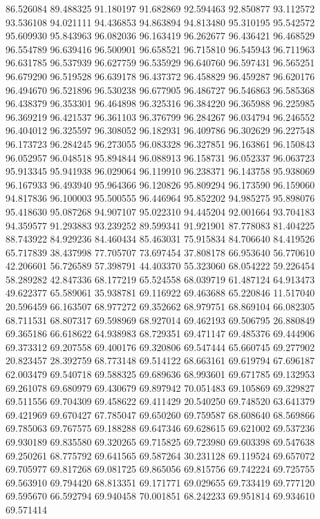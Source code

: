 86.526084
89.488325
91.180197
91.682869
92.594463
92.850877
93.112572
93.536108
94.021111
94.436853
94.863894
94.813480
95.310195
95.542572
95.609930
95.843963
96.082036
96.163419
96.262677
96.436421
96.468529
96.554789
96.639416
96.500901
96.658521
96.715810
96.545943
96.711963
96.631785
96.537939
96.627759
96.535929
96.640760
96.597431
96.565251
96.679290
96.519528
96.639178
96.437372
96.458829
96.459287
96.620176
96.494670
96.521896
96.530238
96.677905
96.486727
96.546863
96.585368
96.438379
96.353301
96.464898
96.325316
96.384220
96.365988
96.225985
96.369219
96.421537
96.361103
96.376799
96.284267
96.034794
96.246552
96.404012
96.325597
96.308052
96.182931
96.409786
96.302629
96.227548
96.173723
96.284245
96.273055
96.083328
96.327851
96.163861
96.150843
96.052957
96.048518
95.894844
96.088913
96.158731
96.052337
96.063723
95.913345
95.941938
96.029064
96.119910
96.238371
96.143758
95.938069
96.167933
96.493940
95.964366
96.120826
95.809294
96.173590
96.159060
94.817836
96.100003
95.500555
96.446964
95.852202
94.985275
95.898076
95.418630
95.087268
94.907107
95.022310
94.445204
92.001664
93.704183
94.359577
91.293883
93.239252
89.599341
91.921901
87.778083
81.404225
88.743922
84.929236
84.460434
85.463031
75.915834
84.706640
84.419526
65.717839
38.437998
77.705707
73.697454
37.808178
66.953640
56.770610
42.206601
56.726589
57.398791
44.403370
55.323060
68.054222
59.226454
58.289282
42.847336
68.177219
65.524558
68.039719
61.487124
64.913473
49.622377
65.589061
35.938781
69.116922
69.463688
65.220846
11.517040
20.596459
66.163507
68.977272
69.352662
68.979751
68.869104
66.082305
68.711531
68.807317
69.598969
68.927014
69.462193
69.506795
26.880849
69.365186
66.618622
64.938983
68.729351
69.471147
69.485376
69.444906
69.373312
69.207558
69.400176
69.320806
69.547444
65.660745
69.277902
20.823457
28.392759
68.773148
69.514122
68.663161
69.619794
67.696187
62.003479
69.540718
69.588325
69.689636
68.993601
69.671785
69.132953
69.261078
69.680979
69.430679
69.897942
70.051483
69.105869
69.329827
69.511556
69.704309
69.458622
69.411429
20.540250
69.748520
63.641379
69.421969
69.670427
67.785047
69.650260
69.759587
68.608640
68.569866
69.785063
69.767575
69.188288
69.647346
69.628615
69.621002
69.537236
69.930189
69.835580
69.320265
69.715825
69.723980
69.603398
69.547638
69.250261
68.775792
69.641565
69.587264
30.231128
69.119524
69.657072
69.705977
69.817268
69.081725
69.865056
69.815756
69.742224
69.725755
69.563910
69.794420
68.813351
69.171771
69.029655
69.733419
69.777120
69.595670
66.592794
69.940458
70.001851
68.242233
69.951814
69.934610
69.571414
